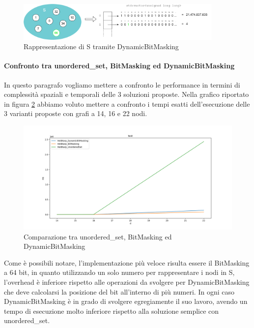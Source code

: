 \begin{figure}[h]
	\centering
	\includegraphics[width=0.9\textwidth]{./images/BitMaskingExtended Example.png}
	\caption{Rappresentazione di S tramite DynamicBitMasking}
	\label{fig:DynamicBitMasking-example}
\end{figure}

\paragraph{Confronto tra unordered\_set, BitMasking ed DynamicBitMasking}
In questo paragrafo vogliamo mettere a confronto le performance in termini di complessità spaziali e temporali delle 3 soluzioni proposte. Nella grafico riportato in figura \ref{fig:UnorderedvsDynamicBitMasking} abbiamo voluto mettere a confronto i tempi esatti dell'esecuzione delle 3 varianti proposte con grafi a 14, 16 e 22 nodi.

\begin{figure}[h]
	\centering
	\includegraphics[width=1\textwidth]{./images/unorderedSet vs BitMasking.png}
	\caption{Comparazione tra unordered\_set, BitMasking ed DynamicBitMasking}
	\label{fig:UnorderedvsDynamicBitMasking}
\end{figure}

Come è possibili notare, l'implementazione più veloce risulta essere il BitMasking a 64 bit, in quanto utilizzando un solo numero per rappresentare i nodi in S, l'overhead è inferiore rispetto alle operazioni da svolgere per DynamicBitMasking che deve calcolarsi la posizione del bit all'interno di più numeri. In ogni caso DynamicBitMasking è in grado di svolgere egregiamente il suo lavoro, avendo un tempo di esecuzione molto inferiore rispetto alla soluzione semplice con unordered\_set.

